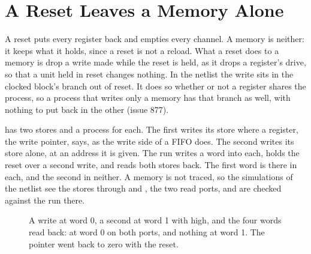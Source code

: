 \section{A Reset Leaves a Memory Alone}
\label{sec:x-rstmem}

A reset puts every register back and empties every channel. A memory
is neither: it keeps what it holds, since a reset is not a reload. What
a reset does to a memory is drop a write made while the reset is held,
as it drops a register's drive, so that a unit held in reset changes
nothing. In the netlist the write sits in the clocked block's branch
out of reset. It does so whether or not a register shares the process,
so a process that writes only a memory has that branch as well, with
nothing to put back in the other (issue 877).

 has two stores and a process for each. The first writes
its store where a register, the write pointer, says, as the write
side of a FIFO does. The second writes its store alone, at an address
it is given. The run writes a word into each, holds the reset over a
second write, and reads both stores back. The first word is there in
each, and the second in neither. A memory is not traced, so the
simulations of the netlist see the stores through  and
, the two read ports, and are checked against the run there.

\begin{figure}[htbp]
\centering

\caption{A write at word 0, a second at word 1 with  high,
and the four words read back:  at word 0 on both ports, and
nothing at word 1. The pointer  went back to zero with the
reset.}
\label{fig:x-rstmem}
\end{figure}




